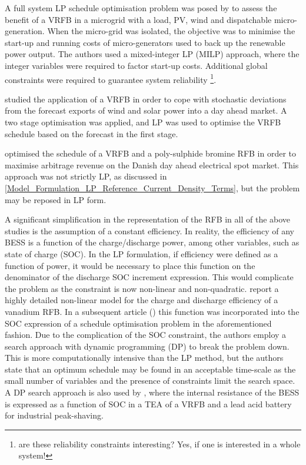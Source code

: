\documentclass[preprint,3p,review,authoryear,10pt]{elsarticle}
\newcommand{\sol}[1]{\footnote{#1}\marginpar{\fbox{\thefootnote}}}
\begin{document}
A full system LP schedule optimisation problem was posed by \cite{Chen2012} to assess the benefit of a VRFB in a microgrid with a load, PV, wind and dispatchable micro-generation. When the micro-grid was isolated, the objective was to minimise the start-up and running costs of micro-generators used to back up the renewable power output. The authors used a mixed-integer LP (MILP) approach, where the integer variables were required to factor start-up costs. Additional global constraints were required to guarantee system reliability \sol{are these reliability constraints interesting? Yes, if one is interested in a whole system!}.

\cite{Gomes2017}  studied the application of a VRFB in order to cope with stochastic deviations from the forecast exports of wind and solar power into a day ahead market. A two stage optimisation was applied, and LP was used to optimise the VRFB schedule based on the forecast  in the first stage.

\cite{Hu2010} optimised the schedule of a VRFB and a poly-sulphide bromine RFB in order to maximise arbitrage revenue on the Danish day ahead electrical spot market. This approach was not strictly LP, as discussed in \cref{Model_Formulation_LP_Reference_Current_Density_Terms}, but the problem may be reposed in LP form.

A significant simplification in the representation of the RFB in all of the above studies is the assumption of a constant efficiency. In reality, the efficiency of any BESS is a function of the charge/discharge power, among other variables, such as state of charge (SOC). In the LP formulation, if efficiency were defined as a  function of power, it would be necessary to place this function on the denominator of the  discharge SOC increment expression. This would complicate the problem as the constraint is now non-linear and non-quadratic. \cite{Nguyen2014} report a highly detailed non-linear model for the charge and discharge efficiency of a vanadium RFB. In a subsequent article (\cite{Nguyen2015}) this function was incorporated into the SOC expression of a schedule optimisation problem in the aforementioned fashion. Due to the complication of the SOC constraint, the authors employ a search approach with dynamic programming (DP) to break the problem down. This is more computationally intensive than the LP method, but the authors state that an optimum schedule may be found in an acceptable time-scale as the small number of variables and the presence of constraints limit the search space.
A DP search approach is also used by \cite{Oudalov2007}, where the internal resistance of the BESS is expressed as a function of SOC in a TEA of a VRFB and a lead acid battery for industrial peak-shaving.
\end{document}
